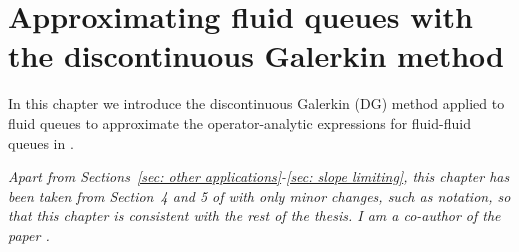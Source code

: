 \chapter{Approximating fluid queues with the discontinuous Galerkin method\label{ch:galerkin}} 

In this chapter we introduce the discontinuous Galerkin (DG) method applied to fluid queues to approximate the operator-analytic expressions for fluid-fluid queues in \cite{bo2014}. 
\begin{center}
	\begin{minipage}{0.8\textwidth}
		\textit{Apart from Sections~\ref{sec: other applications}-\ref{sec: slope limiting}, this chapter has been taken from Section~4 and 5 of \cite{blnos2022} with only minor changes, such as notation, so that this chapter is consistent with the rest of the thesis. I am a co-author of the paper \cite{blnos2022}. %
		}
	\end{minipage}
	\end{center}


